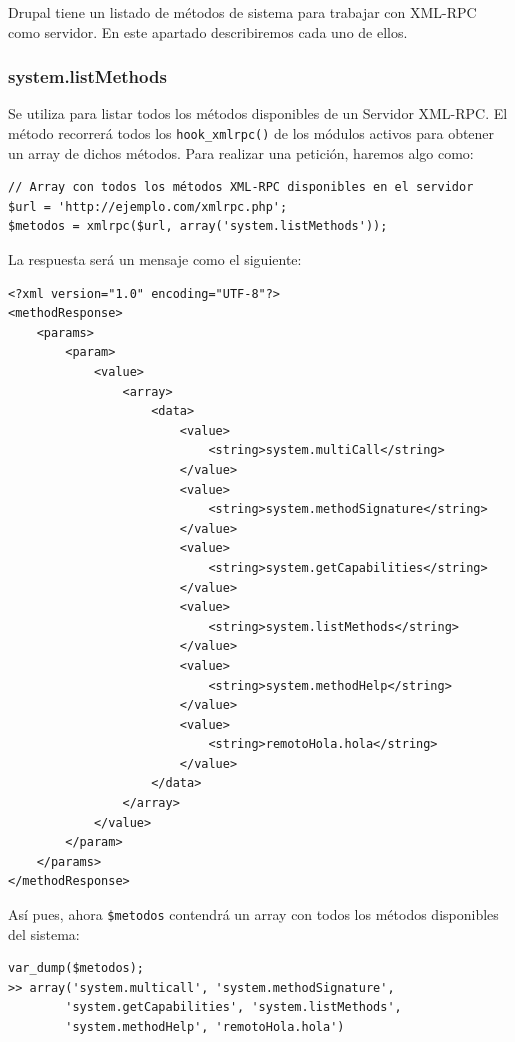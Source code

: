 Drupal tiene un listado de métodos de sistema para trabajar con XML-RPC como servidor. En este apartado describiremos 
cada uno de ellos.

\subsubsection{\large{system.listMethods}}

Se utiliza para listar todos los métodos disponibles de un Servidor XML-RPC. El método recorrerá todos los \verb|hook_xmlrpc()| 
de los módulos activos para obtener un array de dichos métodos.  Para realizar una petición, haremos algo como:

\begin{verbatim}
// Array con todos los métodos XML-RPC disponibles en el servidor
$url = 'http://ejemplo.com/xmlrpc.php';
$metodos = xmlrpc($url, array('system.listMethods'));
\end{verbatim}

La respuesta será un mensaje como el siguiente:

\begin{verbatim}
<?xml version="1.0" encoding="UTF-8"?>
<methodResponse>
    <params>
        <param>
            <value>
                <array>
                    <data>
                        <value>
                            <string>system.multiCall</string>
                        </value>
                        <value>
                            <string>system.methodSignature</string>
                        </value>
                        <value>
                            <string>system.getCapabilities</string>
                        </value>
                        <value>
                            <string>system.listMethods</string>
                        </value>
                        <value>
                            <string>system.methodHelp</string>
                        </value>
                        <value>
                            <string>remotoHola.hola</string>
                        </value>
                    </data>
                </array>
            </value>
        </param>
    </params>
</methodResponse>
\end{verbatim}

Así pues, ahora \verb|$metodos| contendrá un array con todos los métodos disponibles del sistema:

\begin{verbatim}
var_dump($metodos);
>> array('system.multicall', 'system.methodSignature',
		'system.getCapabilities', 'system.listMethods', 
		'system.methodHelp', 'remotoHola.hola')
\end{verbatim}

